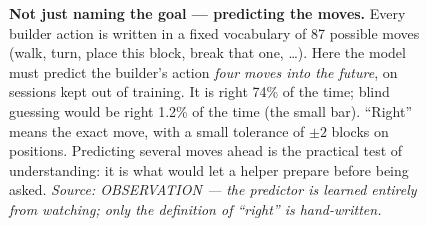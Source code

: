 \documentclass[11pt]{article}
\begin{document}
\begin{figure}[h]
\centering
{}
\caption{\textbf{Not just naming the goal --- predicting the moves.} Every
builder action is written in a fixed vocabulary of 87 possible moves (walk,
turn, place this block, break that one, \ldots). Here the model must predict
the builder's action \emph{four moves into the future}, on sessions kept out
of training. It is right 74\% of the time; blind guessing would be right
1.2\% of the time (the small bar). ``Right'' means the exact move, with a
small tolerance of $\pm2$ blocks on positions. Predicting several moves ahead
is the practical test of understanding: it is what would let a helper prepare
before being asked.
\textit{Source: OBSERVATION --- the predictor is learned entirely from
watching; only the definition of ``right'' is hand-written.}}
\end{figure}
\end{document}
